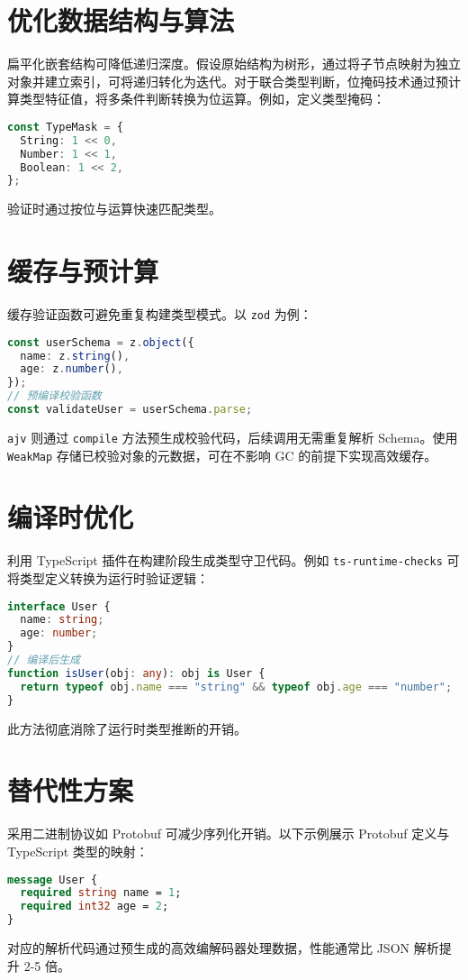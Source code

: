 \section{优化数据结构与算法}
扁平化嵌套结构可降低递归深度。假设原始结构为树形，通过将子节点映射为独立对象并建立索引，可将递归转化为迭代。对于联合类型判断，位掩码技术通过预计算类型特征值，将多条件判断转换为位运算。例如，定义类型掩码：\par
\begin{lstlisting}[language=typescript]
const TypeMask = {
  String: 1 << 0,
  Number: 1 << 1,
  Boolean: 1 << 2,
};
\end{lstlisting}
验证时通过按位与运算快速匹配类型。\par
\section{缓存与预计算}
缓存验证函数可避免重复构建类型模式。以 \verb!zod! 为例：\par
\begin{lstlisting}[language=typescript]
const userSchema = z.object({
  name: z.string(),
  age: z.number(),
});
// 预编译校验函数
const validateUser = userSchema.parse;
\end{lstlisting}
\verb!ajv! 则通过 \verb!compile! 方法预生成校验代码，后续调用无需重复解析 Schema。使用 \verb!WeakMap! 存储已校验对象的元数据，可在不影响 GC 的前提下实现高效缓存。\par
\section{编译时优化}
利用 TypeScript 插件在构建阶段生成类型守卫代码。例如 \verb!ts-runtime-checks! 可将类型定义转换为运行时验证逻辑：\par
\begin{lstlisting}[language=typescript]
interface User {
  name: string;
  age: number;
}
// 编译后生成
function isUser(obj: any): obj is User {
  return typeof obj.name === "string" && typeof obj.age === "number";
}
\end{lstlisting}
此方法彻底消除了运行时类型推断的开销。\par
\section{替代性方案}
采用二进制协议如 Protobuf 可减少序列化开销。以下示例展示 Protobuf 定义与 TypeScript 类型的映射：\par
\begin{lstlisting}[language=protobuf]
message User {
  required string name = 1;
  required int32 age = 2;
}
\end{lstlisting}
对应的解析代码通过预生成的高效编解码器处理数据，性能通常比 JSON 解析提升 2-5 倍。\par
